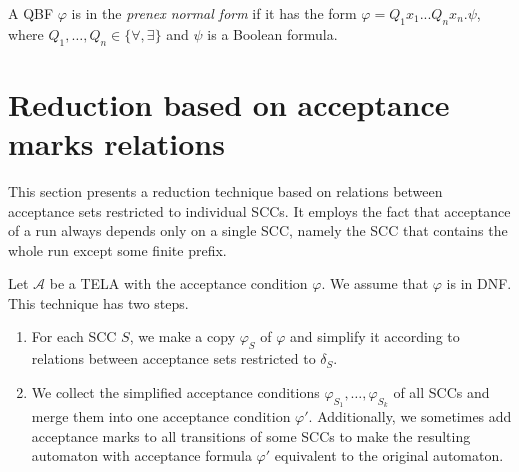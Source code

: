 \documentclass[a4paper,UKenglish,cleveref, autoref, anonymous, thm-restate]{lipics-v2021}
\newcommand{\mA}{\mathcal{A}}
\begin{document}
A QBF $\varphi$ is in the \emph{prenex normal form} if it has the form
$\varphi = Q_{1}x_{1}...Q_{n}x_{n} . \psi$, where
$Q_1,\ldots,Q_n \in \{\forall, \exists\}$ and $\psi$ is a Boolean
formula.


\section{Reduction based on acceptance marks relations}\label{sec:standard}

This section presents a reduction technique based on relations between
acceptance sets restricted to individual SCCs. It employs the fact
that acceptance of a run always depends only on a single SCC, namely
the SCC that contains the whole run except some finite prefix.

Let $\mA$ be a TELA with the acceptance condition $\varphi$. We assume
that $\varphi$ is in DNF. This technique has two steps.
\begin{enumerate}
\item For each SCC $S$, we make a copy $\varphi_S$ of $\varphi$ and
  simplify it according to relations between acceptance sets
  restricted to $\delta_S$. 
\item We collect the simplified acceptance conditions
  $\varphi_{S_1},\ldots,\varphi_{S_k}$ of all SCCs and merge them into
  one acceptance condition $\varphi'$. Additionally, we sometimes add
  acceptance marks to all transitions of some SCCs to make the
  resulting automaton with acceptance formula $\varphi'$ equivalent to
  the original automaton.
\end{enumerate}

\end{document}
